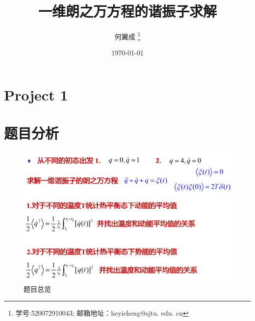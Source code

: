 \documentclass[UTF8,a4paper,10pt]{ctexart}
\title{\textbf{一维朗之万方程的谐振子求解}}
\author{ 何翼成 \thanks{学号:520072910043; \newline
    邮箱地址：heyicheng@sjtu. edu. cn} }
\date{\today}
\begin{document}
\maketitle

\section*{Project 1}
\section{题目分析}
	\begin{figure}[!htbp]
		\centering
		\includegraphics[width=1\textwidth,height=0.6\textwidth]{pictures/pro.png}
		\caption{题目总览} \label{project1}
	\end{figure}
\end{document}
